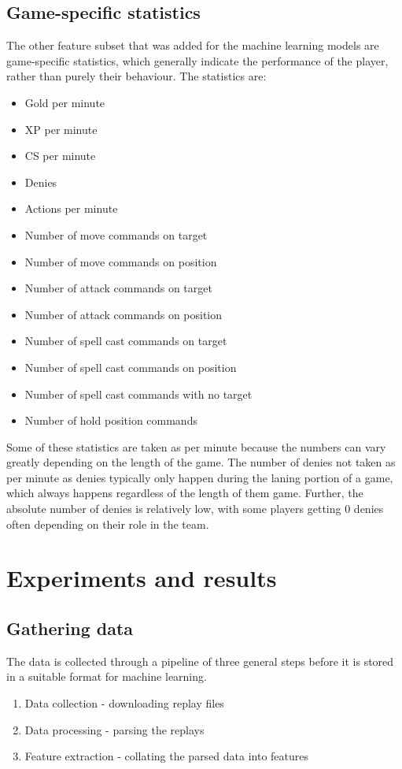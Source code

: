 \documentclass{../sty/SizheArticle}
\begin{document}
\subsection{Game-specific statistics}
The other feature subset that was added for the machine learning models are game-specific statistics, which generally indicate the performance of the player, rather than purely their behaviour. The statistics are:
\begin{itemize}
\item Gold per minute
\item XP per minute
\item CS per minute
\item Denies
\item Actions per minute
\item Number of move commands on target
\item Number of move commands on position
\item Number of attack commands on target
\item Number of attack commands on position
\item Number of spell cast commands on target
\item Number of spell cast commands on position
\item Number of spell cast commands with no target
\item Number of hold position commands
\end{itemize}
Some of these statistics are taken as per minute because the numbers can vary greatly depending on the length of the game. The number of denies not taken as per minute as denies typically only happen during the laning portion of a game, which always happens regardless of the length of them game. Further, the absolute number of denies is relatively low, with some players getting 0 denies often depending on their role in the team.

\section{Experiments and results}

\subsection{Gathering data}
The data is collected through a pipeline of three general steps before it is stored in a suitable format for machine learning. 
\begin{enumerate}
\item Data collection - downloading replay files
\item Data processing - parsing the replays
\item Feature extraction - collating the parsed data into features
\end{enumerate}
\end{document}
